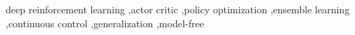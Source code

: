 \begin{abstract}


\end{abstract}

\begin{keyword}
deep reinforcement learning \sep actor critic \sep policy optimization \sep ensemble learning \sep continuous control \sep generalization \sep model-free
\end{keyword}
